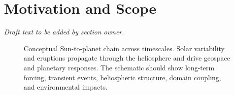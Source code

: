 \documentclass[
  draft
]{agujournal2025}
\begin{document}
\section{Motivation and Scope}

\noindent\textit{Draft text to be added by section owner.}

\begin{figure}[h]
\centering
{}
\caption{Conceptual Sun-to-planet chain across timescales. Solar variability and eruptions propagate through the heliosphere and drive geospace and planetary responses. The schematic should show long-term forcing, transient events, heliospheric structure, domain coupling, and environmental impacts.}
\label{fig:sun-to-planet-chain}
\end{figure}

\end{document}
